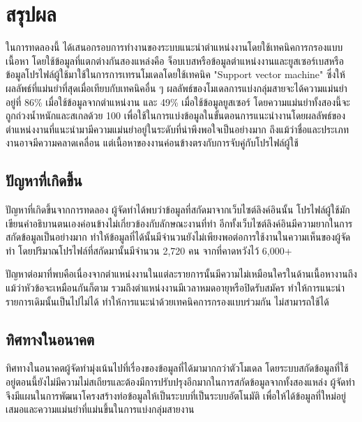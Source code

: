 \chapter{สรุปผล}
\label{chapter:conclusion}
ในการทดลองนี้ ได้เสนอกรอบการทำงานของระบบแนะนำตำแหน่งงานโดยใช้เทคนิคการกรองแบบเนื้อหา โดยใช้ข้อมูลที่แตกต่างกันสองแหล่งคือ จ็อบเบสหรือข้อมูลตำแหน่งงานและยูสเซอร์เบสหรือข้อมูลโปรไฟล์ผู้ใช้มาใช้ในการการเทรนโมเดลโดยใช้เทคนิค "Support vector machine" ซึ่งให้ผลลัพธ์ที่แม่นยำที่สุดเมื่อเทียบกับเทคนิคอื่น ๆ ผลลัพธ์ของโมเดลการแบ่งกลุ่มสายจะได้ความแม่นยำอยู่ที่ 86\% เมื่อใช้ข้อมูลจากตำแหน่งาน และ 49\% เมื่อใช้ข้อมูลยูสเซอร์ โดยความแม่นยำทั้งสองนี้จะถูกถ่วงน้ำหนักและสเกลด้วย 100 เพื่อใช้ในการแบ่งข้อมูลในขั้นตอนการแนะนำงานโดยผลลัพธ์ของตำแหน่งงานที่แนะนำมามีความแม่นยำอยู่ในระดับที่น่าพึงพอใจเป็นอย่างมาก ถึงแม้ว่าชื่อและประเภทงานอาจมีความคลาดเคลื่อน แต่เนื้อหาของงานค่อนข้างตรงกับการจับคู่กับโปรไฟล์ผู้ใช้

\section{ปัญหาที่เกิดขึ้น}
ปัญหาที่เกิดขึ้นจากการทดลอง ผู้จัดทำได้พบว่าข้อมูลที่สกัดมาจากเว็บไซต์ลิงค์อินนั้น โปรไฟล์ผู้ใช้มักเขียนคำอธิบานตนเองค่อนข้างไม่เกี่ยวข้องกับลักษณะงานที่ทำ อีกทั้งเว็บไซต์ลิงค์อินมีความยากในการสกัดข้อมูลเป็นอย่างมาก ทำให้ข้อมูลที่ได้นั้นมีจำนวนยังไม่เพียงพอต่อการใช้งานในความเห็นของผู้จัดทำ โดยปริมาณโปรไฟล์ที่สกัดมานั้นมีจำนวน 2,720 คน จากที่คาดหวังไว้ 6,000+ \par
ปัญหาต่อมาที่พบคือเนื่องจากตำแหน่งงานในแต่ละรายการนั้นมีความไม่เหมือนใครในด้านเนื้อหางานถึงแม้ว่าหัวข้อจะเหมือนกันก็ตาม รวมถึงตำแหน่งงานมีเวลาหมดอายุหรือปิดรับสมัคร ทำให้การแนะนำรายการเดิมนั้นเป็นไปไม่ได้ ทำให้การแนะนำด้วยเทคนิคการกรองแบบร่วมกัน ไม่สามารถใช้ได้ \par

\section{ทิศทางในอนาคต}
ทิศทางในอนาคตผู้จัดทำมุ่งเน้นไปที่เรื่องของข้อมูลที่ได้มามากกว่าตัวโมเดล โดยระบบสกัดข้อมูลที่ใช้อยู่ตอนนี้ยังไม่มีความไม่สเถียรและต้องมีการปรับปรุงอีกมากในการสกัดข้อมูลจากทั้งสองแหล่ง ผู้จัดทำจึงมีแผนในการพัฒนาโครงสร้างท่อข้อมูลให้เป็นระบบที่เป็นระบบอัตโนมัติ เพื่อให้ได้ข้อมูลที่ใหม่อยู่เสมอและความแม่นยำที่แม่นขึ้นในการแบ่งกลุ่มสายงาน

